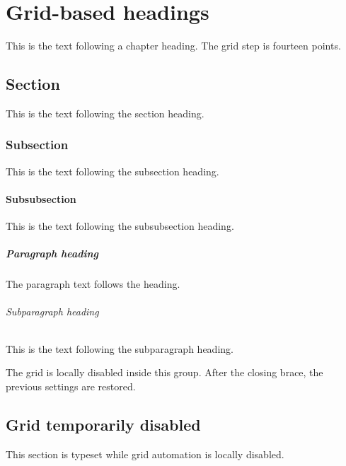 \documentclass{report}
\begin{document}
\chapter{Grid-based headings}
This is the text following a chapter heading. The grid step is fourteen points.

\section{Section}
This is the text following the section heading.

\subsection{Subsection}
This is the text following the subsection heading.

\subsubsection{Subsubsection}
This is the text following the subsubsection heading.

\paragraph{Paragraph heading}
The paragraph text follows the heading.

\subparagraph{Subparagraph heading}
This is the text following the subparagraph heading.

{\GridAutoOff
The grid is locally disabled inside this group. After the closing brace, the previous settings are restored.
}

\begin{gridautoff}
\section{Grid temporarily disabled}
This section is typeset while grid automation is locally disabled.
\end{gridautoff}
\end{document}
